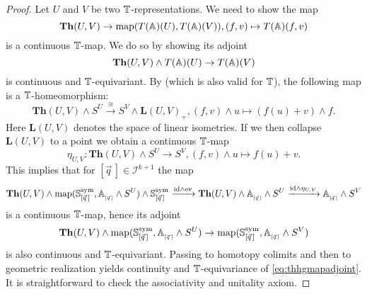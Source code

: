 \begin{proof}
Let $U$ and $V$ be two $\mathbb{T}$-representations.
We need to show the map
\begin{equation}\label{eq:thhgmap}
\mathbf{Th}(U,V)\to \mathrm{map}(T(\mathbb{A})(U), T(\mathbb{A})(V)), (f,v)\mapsto T(\mathbb{A})(f,v)
\end{equation}
is a continuous $\mathbb{T}$-map. We do so by showing its adjoint
\begin{equation}\label{eq:thhgmapadjoint}
\mathbf{Th}(U,V)\wedge T(\mathbb{A})(U)\to T(\mathbb{A})(V)
\end{equation}
is continuous and  $\mathbb{T}$-equivariant. By
\cite[Lemma~3.9, \pno~1503]{rvadams} (which is also valid for
$\mathbb{T}$), the following map is a $\mathbb{T}$-homeomorphism:
\[
\mathbf{Th}(U,V)\wedge S^U\xrightarrow{\cong} S^V\wedge \mathbf{L}(U,V)_+, (f,v)\wedge u\mapsto (f(u)+v)\wedge f.
\]
Here $ \mathbf{L}(U,V)$ denotes the space of linear isometries. If we then collapse
$ \mathbf{L}(U,V)$ to a point we obtain a continuous $\mathbb{T}$-map
\[
\eta_{U,V}:\mathbf{Th}(U,V)\wedge S^U\to S^V, (f,v)\wedge u\mapsto f(u) + v.
\]
This implies that for
$[\vec{q}\,]\in \mathcal{I}^{k+1}$ the map
\[
\mathbf{Th}(U,V)\wedge \mathrm{map}(\mathbb{S}^{\mathrm{sym}}_{[\vec{q}\,]},
\mathbb{A}_{_{[\vec{q}\,]}}\wedge S^U)\wedge \mathbb{S}^{\mathrm{sym}}_{[\vec{q}\,]}
\xrightarrow{\mathrm{id}\wedge\mathrm{ev}}
\mathbf{Th}(U,V)\wedge \mathbb{A}_{_{[\vec{q}\,]}}\wedge S^U
\xrightarrow{\mathrm{id}\wedge \eta_{U,V}}
\mathbb{A}_{_{[\vec{q}\,]}}\wedge S^V
\]
is a continuous $\mathbb{T}$-map, hence its adjoint
\[\mathbf{Th}(U,V)\wedge \mathrm{map}(\mathbb{S}^{\mathrm{sym}}_{[\vec{q}\,]},
\mathbb{A}_{_{[\vec{q}\,]}}\wedge S^U)
\to  \mathrm{map}(\mathbb{S}^{\mathrm{sym}}_{[\vec{q}\,]},
\mathbb{A}_{_{[\vec{q}\,]}}\wedge S^V)\]
is also continuous and $\mathbb{T}$-equivariant. Passing to homotopy colimits
and then to geometric realization yields continuity and $\mathbb{T}$-equivariance
of \eqref{eq:thhgmapadjoint}. It is straightforward to check the associativity
and unitality axiom.
\end{proof}



